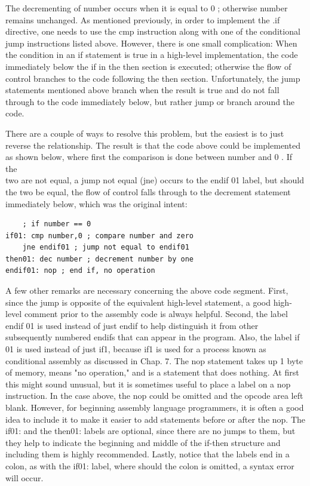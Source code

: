 \documentclass[10pt]{book}
\begin{document}
The decrementing of number occurs when it is equal to 0 ; otherwise number remains unchanged. As mentioned previously, in order to implement the .if directive, one needs to use the cmp instruction along with one of the conditional jump instructions listed above. However, there is one small complication: When the condition in an if statement is true in a high-level implementation, the code immediately below the if in the then section is executed; otherwise the flow of control branches to the code following the then section. Unfortunately, the jump statements mentioned above branch when the result is true and do not fall through to the code immediately below, but rather jump or branch around the code.

There are a couple of ways to resolve this problem, but the easiest is to just reverse the relationship. The result is that the code above could be implemented as shown below, where first the comparison is done between number and 0 . If the\\
two are not equal, a jump not equal (jne) occurs to the endif 01 label, but should the two be equal, the flow of control falls through to the decrement statement immediately below, which was the original intent:

\begin{verbatim}
    ; if number == 0
if01: cmp number,0 ; compare number and zero
    jne endif01 ; jump not equal to endif01
then01: dec number ; decrement number by one
endif01: nop ; end if, no operation
\end{verbatim}

A few other remarks are necessary concerning the above code segment. First, since the jump is opposite of the equivalent high-level statement, a good high-level comment prior to the assembly code is always helpful. Second, the label endif 01 is used instead of just endif to help distinguish it from other subsequently numbered endifs that can appear in the program. Also, the label if 01 is used instead of just if1, because if1 is used for a process known as conditional assembly as discussed in Chap. 7. The nop statement takes up 1 byte of memory, means "no operation," and is a statement that does nothing. At first this might sound unusual, but it is sometimes useful to place a label on a nop instruction. In the case above, the nop could be omitted and the opcode area left blank. However, for beginning assembly language programmers, it is often a good idea to include it to make it easier to add statements before or after the nop. The if01: and the then01: labels are optional, since there are no jumps to them, but they help to indicate the beginning and middle of the if-then structure and including them is highly recommended. Lastly, notice that the labels end in a colon, as with the if01: label, where should the colon is omitted, a syntax error will occur.
\end{document}
